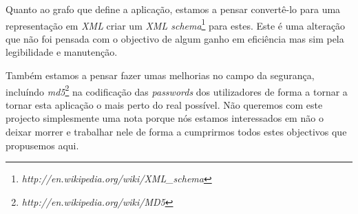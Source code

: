 \documentclass[a4paper]{article}
\begin{document}
\hspace{1cm}Quanto ao grafo que define a aplicação, estamos a pensar convertê-lo para uma representação em {\em XML} criar um {\em XML schema}\footnote{{\em http://en.wikipedia.org/wiki/XML\_schema}} para estes. Este é uma alteração que não foi pensada com o objectivo de algum ganho em eficiência mas sim pela legibilidade e manutenção.

\hspace{1cm}Também estamos a pensar fazer umas melhorias no campo da segurança, incluíndo {\em md5}\footnote{{\em http://en.wikipedia.org/wiki/MD5}} na codificação das {\em passwords} dos utilizadores de forma a tornar a tornar esta aplicação o mais perto do real possível. Não queremos com este projecto simplesmente uma nota porque nós estamos interessados em não o deixar morrer e trabalhar nele de forma a cumprirmos todos estes objectivos que propusemos aqui.

\newpage
\end{document}
